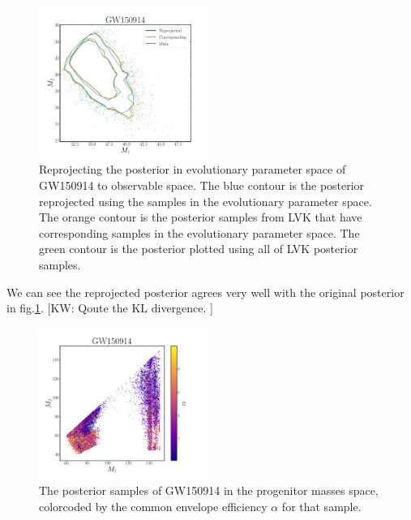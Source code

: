 \documentclass[twocolumn]{aastex631}
\newcommand{\kw}[1]{{\color{rb4}[KW: #1 ]}}
\begin{document}
\begin{figure}
\includegraphics[width=0.49\textwidth]{static/GW150914_reprojection.pdf}
\caption{Reprojecting the posterior in evolutionary parameter space of GW150914 to observable space.
The blue contour is the posterior reprojected using the samples in the evolutionary parameter space.
The orange contour is the posterior samples from LVK that have corresponding samples in the evolutionary parameter space.
The green contour is the posterior plotted using all of LVK posterior samples.
}
\label{fig:GW150914_reprojection}
\end{figure}

We can see the reprojected posterior agrees very well with the original posterior in fig.\ref{fig:GW150914_reprojection}.
\kw{Qoute the KL divergence.}



\begin{figure}
\includegraphics[width=0.49\textwidth]{static/GW150914_m1m2alpha.png}
\caption{The posterior samples of GW150914 in the progenitor masses space, colorcoded by the common envelope efficiency $\alpha$ for that sample.}
\label{fig:GW150914_m1_m2_alpha}
\end{figure}
\end{document}
